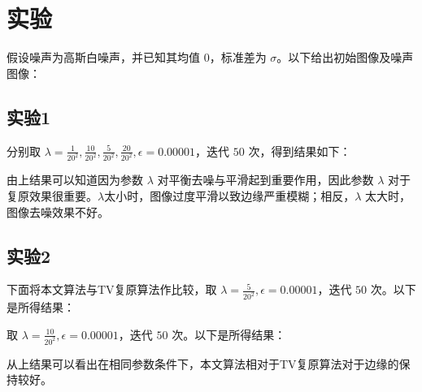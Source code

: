 \section{实验}
假设噪声为高斯白噪声，并已知其均值 $0$，标准差为 $\sigma$。以下给出初始图像及噪声图像：
\begin{figure}[H]
\centering
\subfigure[原始图像]{\label{figure:001} \texttt{[image: 001]}}
\subfigure[噪声图像（$\mu=0,\sigma=20$)]{\label{figure:002} \texttt{[image: 002]}}

\end{figure}

\subsection{实验1}
分别取 $\lambda=\frac{1}{20^2},\frac{10}{20^2},\frac{5}{20^2},\frac{20}{20^2},\epsilon=0.00001$，迭代 $50$ 次，得到结果如下：
\begin{figure}[H]
\centering
\subfigure[$\lambda=\frac{1}{20^2}$]{\label{figure:1/20} \texttt{[image: 003]}}
\subfigure[$\lambda=\frac{5}{20^2}$]{\label{figure:5/20} \texttt{[image: 004]}}
\end{figure}
\begin{figure}[H]
\centering
\subfigure[$\lambda=\frac{10}{20^2}$]{\label{figure:10/20} \texttt{[image: 005]}}
\subfigure[$\lambda=\frac{20}{20^2}$]{\label{figure:20/20} \texttt{[image: 006]}}
\end{figure}
由上结果可以知道因为参数 $\lambda$ 对平衡去噪与平滑起到重要作用，因此参数 $\lambda$ 对于复原效果很重要。$\lambda$太小时，图像过度平滑以致边缘严重模糊；相反，$\lambda$ 太大时，图像去噪效果不好。
\subsection{实验2}
下面将本文算法与TV复原算法作比较，取 $\lambda=\frac{5}{20^2},\epsilon=0.00001$，迭代 $50$ 次。以下是所得结果：
\begin{figure}[H]
\centering
\subfigure[本文算法所得结果]{\label{figure:1/2} \texttt{[image: 007]}}
\subfigure[TV复原算法所得结果]{\label{figure:1} \texttt{[image: 008]}}
\end{figure}
取 $\lambda=\frac{10}{20^2},\epsilon=0.00001$，迭代 $50$ 次。以下是所得结果：
\begin{figure}[H]
\centering
\subfigure[本文算法所得结果]{\label{figure:1/2} \texttt{[image: 009]}}
\subfigure[TV复原算法所得结果]{\label{figure:1} \texttt{[image: 010]}}
\end{figure}
从上结果可以看出在相同参数条件下，本文算法相对于TV复原算法对于边缘的保持较好。



